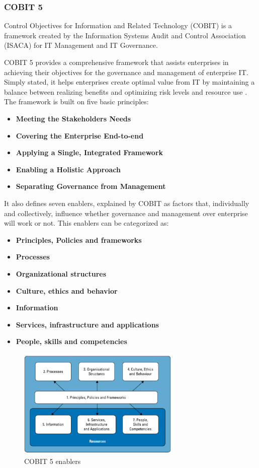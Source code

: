 \subsubsection{COBIT 5}

Control Objectives for Information and Related Technology (COBIT) is a framework created by the Information Systems Audit and Control Association (ISACA) for IT Management and IT Governance.\par
COBIT 5 provides a comprehensive framework that assists enterprises in achieving their objectives for the governance and management of enterprise IT. Simply stated, it helps enterprises create optimal value from IT by maintaining a balance between realizing benefits and optimizing risk levels and resource use \cite{2012cobit}. 
The framework is built on five basic principles:

\begin{itemize}
  \item \textbf{Meeting the Stakeholders Needs} 
  \item \textbf{Covering the Enterprise End-to-end} 
  \item \textbf{Applying a Single, Integrated Framework} 
  \item \textbf{Enabling a Holistic Approach} 
  \item \textbf{Separating Governance from Management}
\end{itemize}


It also defines seven enablers, explained by COBIT as factors that, individually and collectively, influence whether governance and management over enterprise will work or not. This enablers can be categorized as:

\begin{itemize}
  \item \textbf{Principles, Policies and frameworks} 
  \item \textbf{Processes} 
  \item \textbf{Organizational structures} 
  \item \textbf{Culture, ethics and behavior} 
  \item \textbf{Information}
  \item \textbf{Services, infrastructure and applications} 
  \item \textbf{People, skills and competencies}
\end{itemize}

\begin{figure}
\centering
\includegraphics[width=0.7\textwidth]{img/Enablers.png}
\caption{COBIT 5 enablers}
\end{figure}

